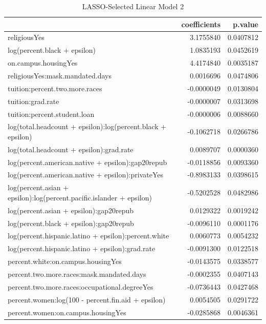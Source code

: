 \documentclass[
]{article}
\begin{document}
\begin{table}

\caption{\label{tab:unnamed-chunk-33}LASSO-Selected Linear Model 2}
\centering
\begin{tabular}[t]{l|r|r}
\hline
  & coefficients & p.value\\
\hline
religiousYes & 3.1755840 & 0.0407812\\
\hline
log(percent.black + epsilon) & 1.0835193 & 0.0452619\\
\hline
on.campus.housingYes & 4.4174840 & 0.0035187\\
\hline
religiousYes:mask.mandated.days & 0.0016696 & 0.0474806\\
\hline
tuition:percent.two.more.races & -0.0000049 & 0.0130804\\
\hline
tuition:grad.rate & -0.0000007 & 0.0313698\\
\hline
tuition:percent.student.loan & -0.0000006 & 0.0088660\\
\hline
log(total.headcount + epsilon):log(percent.black + epsilon) & -0.1062718 & 0.0266786\\
\hline
log(total.headcount + epsilon):grad.rate & 0.0089707 & 0.0000360\\
\hline
log(percent.american.native + epsilon):gap20repub & -0.0118856 & 0.0093360\\
\hline
log(percent.american.native + epsilon):privateYes & -0.8983133 & 0.0398615\\
\hline
log(percent.asian + epsilon):log(percent.pacific.islander + epsilon) & -0.5202528 & 0.0482986\\
\hline
log(percent.asian + epsilon):gap20repub & 0.0129322 & 0.0019242\\
\hline
log(percent.black + epsilon):gap20repub & -0.0096110 & 0.0001176\\
\hline
log(percent.hispanic.latino + epsilon):percent.white & 0.0060773 & 0.0054232\\
\hline
log(percent.hispanic.latino + epsilon):grad.rate & -0.0091300 & 0.0122518\\
\hline
percent.white:on.campus.housingYes & -0.0143575 & 0.0338577\\
\hline
percent.two.more.races:mask.mandated.days & -0.0002355 & 0.0407143\\
\hline
percent.two.more.races:occupational.degreeYes & -0.0736443 & 0.0427468\\
\hline
percent.women:log(100 - percent.fin.aid + epsilon) & 0.0054505 & 0.0291722\\
\hline
percent.women:on.campus.housingYes & -0.0285868 & 0.0046361\\

\end{tabular}
\end{table}
\end{document}
